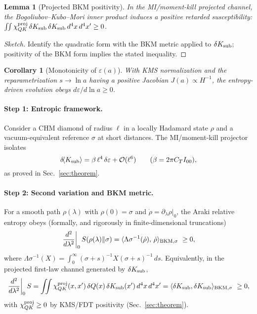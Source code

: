 \documentclass[aps,prd,onecolumn,superscriptaddress,nofootinbib]{revtex4-2}
\def\Omega_\Lambda{OmegaLambda}%
\newtheorem{lemma}{Lemma}
\newtheorem{corollary}{Corollary}
\begin{document}
\begin{lemma}[Projected BKM positivity]
In the MI/moment-kill projected channel, the Bogoliubov--Kubo--Mori inner product induces a positive retarded susceptibility: $\iint \chi^{\rm proj}_{QK}\,\delta K_{\rm sub}\,\delta K_{\rm sub}\,d^4x\,d^4x' \ge 0$.
\end{lemma}
\begin{proof}[Sketch]
Identify the quadratic form with the BKM metric applied to $\delta K_{\rm sub}$; positivity of the BKM form implies the stated inequality.
\end{proof}
\begin{corollary}[Monotonicity of $\varepsilon(a)$]
With KMS normalization and the reparametrization $s\to\ln a$ having a positive Jacobian $J(a)\propto H^{-1}$, the entropy-driven evolution obeys $d\varepsilon/d\ln a\ge 0$.
\end{corollary}

\paragraph{Step 1: Entropic framework.}
Consider a CHM diamond of radius \(\ell\) in a locally Hadamard state \(\rho\) and a vacuum-equivalent reference \(\sigma\) at short distances. The MI/moment-kill projector isolates
\[
\delta\!\langle K_{\rm sub}\rangle=\beta\,\ell^4\,\delta\varepsilon+\mathcal O(\ell^6)\qquad(\beta=2\pi C_T I_{00}),
\]
as proved in Sec.~\ref{sec:theorem}.

\paragraph{Step 2: Second variation and BKM metric.}
For a smooth path \(\rho(\lambda)\) with \(\rho(0)=\sigma\) and \(\dot\rho=\partial_\lambda\rho|_0\),
the Araki relative entropy obeys (formally, and rigorously in finite-dimensional truncations)
\[
\left.\frac{d^2}{d\lambda^2}\right|_0 S(\rho(\lambda)\Vert\sigma)
=\langle \Omega_\sigma^{-1}(\dot\rho),\,\dot\rho\rangle_{\rm BKM,\sigma}\ \ge 0,
\]
where \(\Omega_\sigma^{-1}(X)=\int_0^\infty\!\!(\sigma+s)^{-1}X(\sigma+s)^{-1}\,ds\).
Equivalently, in the projected first-law channel generated by \(\delta K_{\rm sub}\),
\[
\left.\frac{d^2}{d\lambda^2}\right|_0 S
=\iint \chi^{\rm proj}_{QK}(x,x')\,\delta Q(x)\,\delta K_{\rm sub}(x')\,d^4x\,d^4x'
=\langle \delta K_{\rm sub},\delta K_{\rm sub}\rangle_{\rm BKM,\sigma}\ \ge 0,
\]
with \(\chi^{\rm proj}_{QK}\ge 0\) by KMS/FDT positivity (Sec.~\ref{sec:theorem}).
\end{document}
